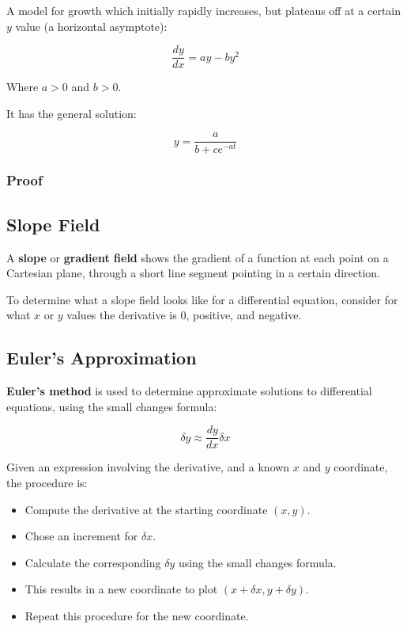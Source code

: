 \documentclass[a4paper,11pt]{report}
\begin{document}
A model for growth which initially rapidly increases, but plateaus off at a
certain $y$ value (a horizontal asymptote):

$$
\frac{dy}{dx} = ay - by^2
$$

Where $a > 0$ and $b > 0$.

It has the general solution:

$$
y = \frac{a}{b + ce^{-at}}
$$

\subsubsection{Proof}


\subsection{Slope Field}

A \textbf{slope} or \textbf{gradient field} shows the gradient of a function at
each point on a Cartesian plane, through a short line segment pointing in a
certain direction.

To determine what a slope field looks like for a differential equation, consider
for what $x$ or $y$ values the derivative is 0, positive, and negative.

\subsection{Euler's Approximation}

\textbf{Euler's method} is used to determine approximate solutions to
differential equations, using the small changes formula:

$$
\delta y \approx \frac{dy}{dx} \delta x
$$

Given an expression involving the derivative, and a known $x$ and $y$
coordinate, the procedure is:

\begin{itemize}
\item Compute the derivative at the starting coordinate $(x, y)$.
\item Chose an increment for $\delta x$.
\item Calculate the corresponding $\delta y$ using the small changes formula.
\item This results in a new coordinate to plot $(x + \delta x, y + \delta y)$.
\item Repeat this procedure for the new coordinate.
\end{itemize}
\end{document}
